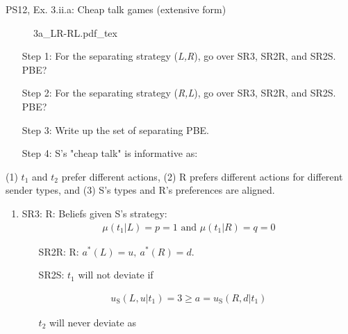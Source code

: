 \begin{frame}{PS12, Ex. 3.ii.a: Cheap talk games (extensive form)}
    \begin{multicols}{2}
      \begin{figure}[!h]
        \center{}
        {3a_LR-RL.pdf_tex}
      \end{figure}\vspace{-8pt}
      \begin{itemize}
        \item[Step 1:] For the separating strategy (\textit{L,R}), go over SR3, SR2R, and SR2S. PBE?
        \item[Step 2:] \vspace{-2pt}For the separating strategy (\textit{R,L}), go over SR3, SR2R, and SR2S. PBE?
        \item[Step 3:] \vspace{-2pt}Write up the set of separating PBE.
        \item[Step 4:] \vspace{-2pt}S's "cheap talk" is informative as:
      \end{itemize}\vspace{-6pt}
      (1) $t_1$ and $t_2$ prefer different actions, (2) R prefers different actions for different sender types, and (3) S’s types and R’s preferences are aligned.
      \vfill\null\columnbreak
      \begin{enumerate}
        \item SR3: R: Beliefs given S's strategy:\vspace{-8pt}
        \begin{align*}
          \mu(t_1|L)=p=1\text{ and }\mu(t_1|R)=q=0
        \end{align*}\vspace{-18pt}
        \begin{itemize}\normalsize
          \item[SR2R:] R: $a^*(L)=u,\ a^*(R)=d$.
          \item[SR2S:] $t_1$ will not deviate if
        \end{itemize}\vspace{-10pt}
        \begin{align*}
          u_\text{S}(L,u|t_1)=3\geq a=u_\text{S}(R,d|t_1)
        \end{align*}\vspace{-18pt}
        \begin{itemize}\normalsize
          \item[] $t_2$ will never deviate as

\end{itemize}
\end{enumerate}
\end{multicols}
\end{frame}

